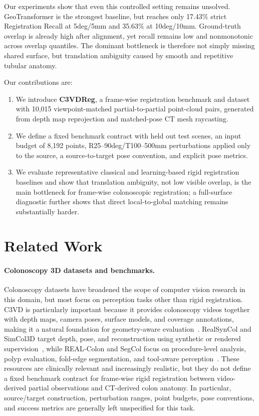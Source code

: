 \documentclass{bmvc2k}
\begin{document}
Our experiments show that even this controlled setting remains unsolved. GeoTransformer is the strongest baseline, but reaches only 17.43\% strict Registration Recall at 5deg/5mm and 35.63\% at 10deg/10mm. Ground-truth overlap is already high after alignment, yet recall remains low and nonmonotonic across overlap quantiles. The dominant bottleneck is therefore not simply missing shared surface, but translation ambiguity caused by smooth and repetitive tubular anatomy.

Our contributions are:
\begin{enumerate}
    \item We introduce \textbf{C3VDReg}, a frame-wise registration benchmark and dataset with 10,015 viewpoint-matched partial-to-partial point-cloud pairs, generated from depth map reprojection and matched-pose CT mesh raycasting.
    \item We define a fixed benchmark contract with held out test scenes, an input budget of 8,192 points, R25--90deg/T100--500mm perturbations applied only to the source, a source-to-target pose convention, and explicit pose metrics.
    \item We evaluate representative classical and learning-based rigid registration baselines and show that translation ambiguity, not low visible overlap, is the main bottleneck for frame-wise colonoscopic registration; a full-surface diagnostic further shows that direct local-to-global matching remains substantially harder.
\end{enumerate}


\section{Related Work}
\label{sec:related}

\paragraph{Colonoscopy 3D datasets and benchmarks.}
Colonoscopy datasets have broadened the scope of computer vision research in this domain, but most focus on perception tasks other than rigid registration. C3VD is particularly important because it provides colonoscopy videos together with depth maps, camera poses, surface models, and coverage annotations, making it a natural foundation for geometry-aware evaluation~\cite{bobrow2023colonoscopy}. RealSynCol and SimCol3D target depth, pose, and reconstruction using synthetic or rendered supervision~\cite{lena2026realsyncol,rau2024simcol3d}, while REAL-Colon and SegCol focus on procedure-level analysis, polyp evaluation, fold-edge segmentation, and tool-aware perception~\cite{biffi2024realcolon,ju2024segcol}. These resources are clinically relevant and increasingly realistic, but they do not define a fixed benchmark contract for frame-wise rigid registration between video-derived partial observations and CT-derived colon anatomy. In particular, source/target construction, perturbation ranges, point budgets, pose conventions, and success metrics are generally left unspecified for this task.
\end{document}

